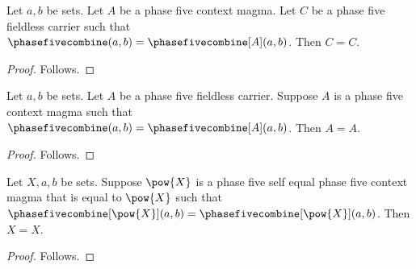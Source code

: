 \begin{proposition}\label{notion_structure_unique_receiver}
    Let $a,b$ be sets.
    Let $A$ be a phase five context magma.
    Let $C$ be a phase five fieldless carrier such that
        $\phasefivecombine(a,b)=\phasefivecombine[A](a,b)$.
    Then $C=C$.
\end{proposition}
\begin{proof}
    Follows.
\end{proof}

\begin{proposition}\label{notion_structure_phrase_shadow}
    Let $a,b$ be sets.
    Let $A$ be a phase five fieldless carrier.
    Suppose $A$ is a phase five context magma such that
        $\phasefivecombine(a,b)=\phasefivecombine[A](a,b)$.
    Then $A=A$.
\end{proposition}
\begin{proof}
    Follows.
\end{proof}

\begin{proposition}\label{notion_structure_term_subject}
    Let $X,a,b$ be sets.
    Suppose $\pow{X}$ is a phase five self equal phase five context magma
        that is equal to $\pow{X}$ such that
        $\phasefivecombine[\pow{X}](a,b)=
            \phasefivecombine[\pow{X}](a,b)$.
    Then $X=X$.
\end{proposition}
\begin{proof}
    Follows.
\end{proof}
